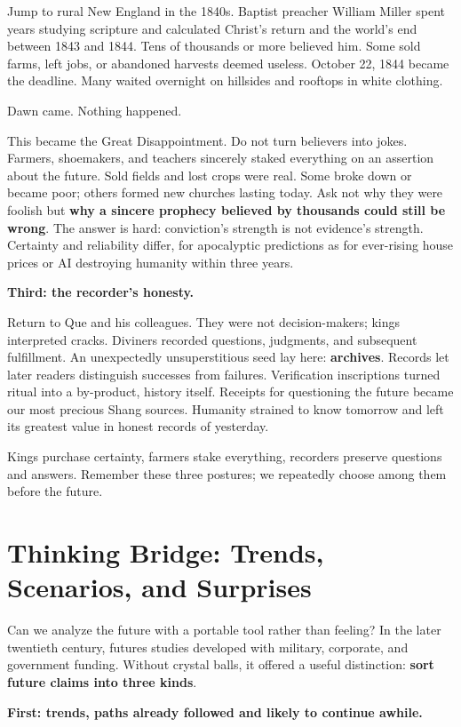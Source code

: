 Jump to rural New England in the 1840s. Baptist preacher William Miller spent years studying scripture and calculated Christ's return and the world's end between 1843 and 1844. Tens of thousands or more believed him. Some sold farms, left jobs, or abandoned harvests deemed useless. October 22, 1844 became the deadline. Many waited overnight on hillsides and rooftops in white clothing.

Dawn came. Nothing happened.

This became the Great Disappointment. Do not turn believers into jokes. Farmers, shoemakers, and teachers sincerely staked everything on an assertion about the future. Sold fields and lost crops were real. Some broke down or became poor; others formed new churches lasting today. Ask not why they were foolish but \textbf{why a sincere prophecy believed by thousands could still be wrong}. The answer is hard: conviction's strength is not evidence's strength. Certainty and reliability differ, for apocalyptic predictions as for ever-rising house prices or AI destroying humanity within three years.

\textbf{Third: the recorder's honesty.}

Return to Que and his colleagues. They were not decision-makers; kings interpreted cracks. Diviners recorded questions, judgments, and subsequent fulfillment. An unexpectedly unsuperstitious seed lay here: \textbf{archives}. Records let later readers distinguish successes from failures. Verification inscriptions turned ritual into a by-product, history itself. Receipts for questioning the future became our most precious Shang sources. Humanity strained to know tomorrow and left its greatest value in honest records of yesterday.

Kings purchase certainty, farmers stake everything, recorders preserve questions and answers. Remember these three postures; we repeatedly choose among them before the future.

\section[Trends, Scenarios, and Surprises]{Thinking Bridge: Trends, Scenarios, and Surprises}
Can we analyze the future with a portable tool rather than feeling? In the later twentieth century, futures studies developed with military, corporate, and government funding. Without crystal balls, it offered a useful distinction: \textbf{sort future claims into three kinds}.

\textbf{First: trends, paths already followed and likely to continue awhile.}


